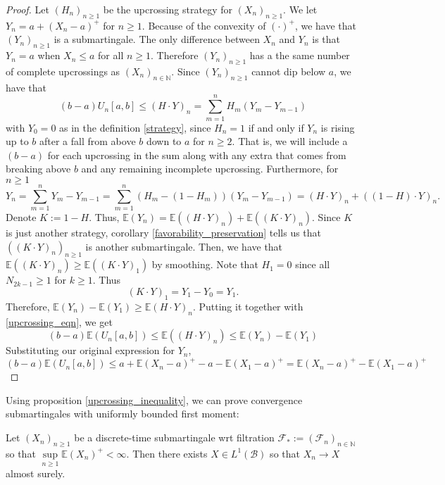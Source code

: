 \begin{proof}
    Let $(H_{n})_{n \geq 1}$ be the upcrossing strategy for $(X_{n})_{n \geq 1}$. We let $Y_{n} = a + (X_{n} - a)^{+}$ for $n \geq 1$. Because of the convexity of $(\cdot)^{+}$, we have that $(Y_{n})_{n \geq 1}$ is a submartingale. The only difference between $X_{n}$ and $Y_{n}$ is that $Y_{n} = a$ when $X_{n} \leq a$ for all $n \geq 1$. Therefore $(Y_{n})_{n \geq 1}$ has a the same number of complete upcrossings as $(X_{n})_{n \in \mathbb{N}}$. Since $(Y_{n})_{n \geq 1}$ cannot dip below $a$, we have that
    \begin{equation}
        \label{upcrossing_eqn}
        (b-a)U_{n}[a,b] \leq (H \cdot Y)_{n} = \sum\limits_{m=1}^{n} H_{m}(Y_{m} - Y_{m-1})
    \end{equation}
    with $Y_{0} = 0$ as in the definition \ref{strategy}, since $H_{n} = 1$ if and only if $Y_{n}$ is rising up to $b$ after a fall from above $b$ down to $a$ for $n \geq 2$. That is, we will include a $(b-a)$ for each upcrossing in the sum along with any extra that comes from breaking above $b$ and any remaining incomplete upcrossing. Furthermore, for $n \geq 1$
    $$Y_{n} = \sum\limits_{m=1}^{n} Y_{m} - Y_{m-1} = \sum\limits_{m=1}^{n} (H_{m} - (1 - H_{m}))(Y_{m} - Y_{m-1}) = (H \cdot Y)_{n} + ((1-H) \cdot Y)_{n}.$$
    Denote $K := 1-H$. Thus, $\mathbb{E}(Y_{n})= \mathbb{E}((H \cdot Y)_{n}) + \mathbb{E}((K \cdot Y)_{n})$. Since $K$ is just another strategy, corollary \ref{favorability_preservation} tells us that $((K \cdot Y)_{n})_{n \geq 1}$ is another submartingale. Then, we have that $\mathbb{E}((K \cdot Y)_{n}) \geq \mathbb{E}((K \cdot Y)_{1})$ by smoothing. Note that $H_{1} = 0$ since all $N_{2k-1} \geq 1$ for $k \geq 1$. Thus 
    $$(K \cdot Y)_{1} = Y_{1} - Y_{0} = Y_{1}.$$
    Therefore, $\mathbb{E}(Y_{n}) - \mathbb{E}(Y_{1}) \geq \mathbb{E}(H \cdot Y)_{n}$. Putting it together with \ref{upcrossing_eqn}, we get
    $$(b-a)\mathbb{E}(U_{n}[a,b]) \leq \mathbb{E}((H \cdot Y)_{n}) \leq \mathbb{E}(Y_{n}) - \mathbb{E}(Y_{1})$$
    Substituting our original expression for $Y_{n}$,
    $$(b-a)\mathbb{E}(U_{n}[a,b]) \leq a + \mathbb{E}(X_{n} - a)^{+} - a - \mathbb{E}(X_{1} - a)^{+} = \mathbb{E}(X_{n} - a)^{+} - \mathbb{E}(X_{1} - a)^{+}$$
\end{proof}

Using proposition \ref{upcrossing_inequality}, we can prove convergence submartingales with uniformly bounded first moment:

\begin{theorem}
    \label{martingale_convergence}
    Let $(X_{n})_{n \geq 1}$ be a discrete-time submartingale wrt filtration $\mathcal{F}_{*} := (\mathcal{F}_{n})_{n \in \mathbb{N}}$ so that \(\sup\limits_{n \geq 1} \mathbb{E}(X_{n})^{+} < \infty\). Then there exists \(X \in L^{1}(\mathcal{B})\) so that \(X_{n} \to X\) almost surely.
\end{theorem}

